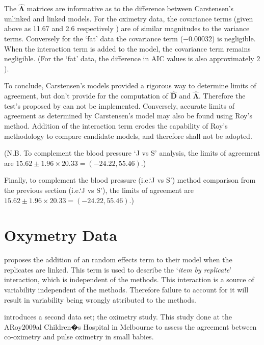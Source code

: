 \documentclass[12pt, a4paper]{report}
\theoremstyle{plain}
\theoremstyle{definition}
\theoremstyle{remark}
\begin{document}
	
	The $\boldsymbol{\hat{\Lambda}}$ matrices are informative as to the difference between Carstensen's unlinked and linked models. For the oximetry data, the covariance terms (given above as 11.67 and 2.6 respectively ) are of similar magnitudes to the variance terms. Conversely for the `fat' data the covariance term ($-0.00032$) is negligible. When the interaction term is added to the model, the covariance term remains negligible. (For the `fat' data, the difference in AIC values is also approximately $2$).
	
	To conclude, Carstensen's models provided a rigorous way to determine limits of agreement, but don't provide for the computation of $\boldsymbol{\hat{D}}$ and $\boldsymbol{\hat{\Lambda}}$. Therefore the test's proposed by \citet{roy} can not be implemented. Conversely, accurate limits of agreement as determined by Carstensen's model may also be found using Roy's method. Addition of the interaction term erodes the capability of Roy's methodology to compare candidate models, and therefore shall not be adopted.

	
	(N.B. To complement the blood pressure `J vs S' analysis, the limits of agreement are $15.62 \pm 1.96 \times 20.33 = (-24.22, 55.46)$.)
	\newpage
	
	

	

	
	
	



	
	Finally, to complement the blood pressure (i.e.`J vs S') method comparison from the previous section (i.e.`J vs S'), the limits of agreement are $15.62 \pm 1.96 \times 20.33 = (-24.22, 55.46)$.)
	\newpage	

	\section{Oxymetry Data}
	\citet{BXC2008} proposes the addition of an random effects term to their model when the replicates are linked. This term is used to describe the `\textit{item by replicate}' interaction, which is independent of the methods. This interaction is a source of variability independent of the methods. Therefore failure to account for it will result in variability being wrongly attributed to the methods.
	
	\citet{BXC2008} introduces a second data set; the oximetry study. This study done at the ARoy2009al Children�s Hospital in
	Melbourne to assess the agreement between co-oximetry and pulse oximetry in small babies.
	
\end{document}
